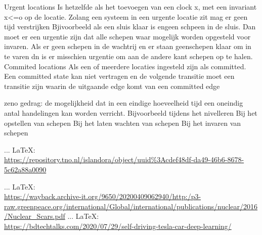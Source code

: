 \begin{thebibliography}{99}
{{{{{{%
%
%
%
%
%
%

Urgent locations
Is hetzelfde als het toevoegen van een clock x, met een invariant x<=o op de locatie. Zolang een systeem in een urgente locatie zit mag er geen tijd verstrijken
Bjivoorbeeld als een sluis klaar is engeen schpeen in de sluis. Dan moet er een urgentie zijn dat alle schepen waar mogelijk worden opgesteld voor invaren. Als er geen schepen in de wachtrij en er staan geenschepen klaar om in te varen dn is er misschien urgentie om aan de andere kant schepen op te halen.
Commited locations
Als een of meerdere locaties ingesteld zijn als committed. Een committed state kan niet vertragen  en de volgende transitie moet een transitie zijn waarin de uitgaande edge komt van een committed edge


zeno gedrag: de mogelijkheid dat in een eindige hoeveelheid tijd een oneindig antal handelingen kan worden verricht.
Bijvoorbeeld tijdens het nivelleren
Bij het opstellen van schepen
Bij het laten wachten van schepen
Bij het invaren van schepen



 ... \LaTeX:\\ \url{https://repository.tno.nl/islandora/object/uuid%3Acdef48df-da49-46b6-8678-5c62a88a0090 }
 



 ... \LaTeX:\\ \url{https://wayback.archive-it.org/9650/20200409062940/http:/p3-raw.greenpeace.org/international/Global/international/publications/nuclear/2016/Nuclear_Scars.pdf}
 ... \LaTeX:\\ \url{https://bdtechtalks.com/2020/07/29/self-driving-tesla-car-deep-learning/}



}}}}}}
\end{thebibliography}
